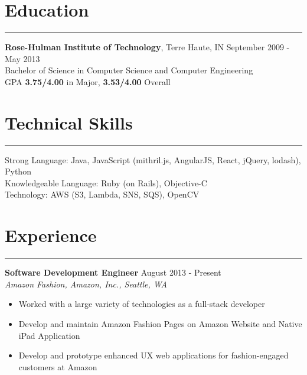 \documentclass[line]{res} %
\begin{document}

\address{
  2801 1st Ave, Unit 613 \\
  Seattle, WA 98121 \\
  (812) 575-0373 \\
  simon@divby0.io \\
  \underline{http://www.divby0.io}
}

\begin{resume}

  \section{Education}
  \rule{\textwidth}{1pt}
    \textbf{Rose-Hulman Institute of Technology}, Terre Haute, IN
    \hfill September 2009 - May 2013 \\
    Bachelor of Science in Computer Science and Computer Engineering \\
    GPA \textbf{3.75/4.00} in Major, \textbf{3.53/4.00} Overall

  \section{Technical Skills}
  \rule{\textwidth}{1pt}
    Strong Language: Java, JavaScript (mithril.js, AngularJS, React, jQuery, lodash), Python \\
    Knowledgeable Language: Ruby (on Rails), Objective-C \\
    Technology: AWS (S3, Lambda, SNS, SQS), OpenCV

  \section{Experience}
  \rule{\textwidth}{1pt}
    \textbf{Software Development Engineer}
    \hfill August 2013 - Present \\
    \textit{Amazon Fashion, Amazon, Inc., Seattle, WA}
    \begin{itemize} \itemsep -2pt  %
      \item Worked with a large variety of technologies as a full-stack developer
      \item Develop and maintain Amazon Fashion Pages on Amazon Website and Native iPad Application
      \item Develop and prototype enhanced UX web applications for fashion-engaged customers at Amazon
    \end{itemize}



\end{resume}
\end{document}
